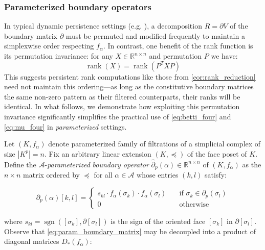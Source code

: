 \documentclass[pdflatex,sn-mathphys-num]{sn-jnl}
\begin{document}
\subsubsection{Parameterized boundary operators}\label{sec:param_boundary}

In typical dynamic persistence settings (e.g. \cite{cohen2006vines}), a decomposition \(R = \partial V\) of the boundary matrix \(\partial\) must be permuted and modified frequently to maintain a simplexwise order respecting \(f_{\alpha}\). In contrast, one benefit of the rank function is its permutation invariance: for any \(X \in \mathbb{R}^{n \times n}\) and permutation \(P\) we have: \[\operatorname{rank}(X) = \operatorname{rank} \left( P^{T}XP \right) \] This suggests persistent rank computations like those from \ref{cor:rank_reduction} need not maintain this ordering---as long as the constitutive boundary matrices the same non-zero pattern as their filtered counterparts, their ranks will be identical. In what follows, we demonstrate how exploiting this permutation invariance significantly simplifies the practical use of \ref{eq:betti_four} and \ref{eq:mu_four} in \emph{parameterized} settings.

Let \(\left( K,f_{\alpha} \right)\) denote parameterized family of filtrations of a simplicial complex of size \(\left| K^{p} \right| = n\). Fix an arbitrary linear extension \( (K, \preceq ) \) of the face poset of \(K\). Define the \(\mathcal{A}\)-\emph{parameterized} \emph{boundary operator} \({\hat{\partial}}_{p}(\alpha) \in \mathbb{R}^{n \times n}\) of \(\left( K,f_{\alpha} \right)\) as the \(n \times n\) matrix ordered by \(\preceq\) for all \(\alpha \in \mathcal{A}\) whose entries \((k,l)\) satisfy:

\[\partial_{p}(\alpha) [ k,l]  = \begin{cases}
s_{kl} \cdot f_{\alpha}\left( \sigma_{k} \right) \cdot f_{\alpha}\left( \sigma_{l} \right) & \quad\text{if }\sigma_{k} \in \partial_{p}\left( \sigma_{l} \right) \\
0 & \quad\text{otherwise}
\end{cases}\] \protect{}\label{eq:param_boundary_matrix}{}

where \(s_{kl} = \operatorname{sgn} \left(  \left[ \sigma_{k} \right] ,\partial \left[ \sigma_{l} \right]  \right) \) is the sign of the oriented face \( \left[ \sigma_{k} \right] \) in \(\partial \left[ \sigma_{l} \right] \). Observe that \ref{eq:param_boundary_matrix} may be decoupled into a product of diagonal matrices \(D_{\ast}\left( f_{\alpha} \right)\):
\end{document}
